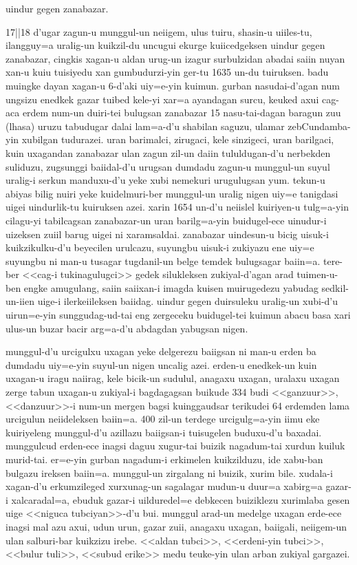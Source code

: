 \documentclass[11pt,a4paper]{article}
\begin{document}
\begin{bicigpage}
	uindur gegen zanabazar.

	17||18 d'ugar zagun-u munggul-un neiigem, ulus tuiru,
	shasin-u uiiles-tu, ilangguy=a uralig-un kuikzil-du
	uncugui ekurge kuiicedgeksen uindur gegen zanabazar,
	cingkis xagan-u aldan urug-un izagur surbulzidan abadai
	saiin nuyan xan-u kuiu tuisiyedu xan gumbudurzi-yin
	ger-tu 1635 un-du tuiruksen.  badu muingke dayan xagan-u
	6-d'aki uiy=e-yin kuimun. gurban nasudai-d'agan num
	ungsizu enedkek gazar tuibed kele-yi xar=a ayandagan
	surcu, keuked axui cag-aca erdem num-un duiri-tei
	bulugsan zanabazar 15 nasu-tai-dagan baragun zuu
	(lhasa) uruzu tabudugar dalai lam=a-d'u shabilan
	saguzu, ulamar zebCundamba-yin xubilgan tudurazei. uran
	barimalci, zirugaci, kele sinzigeci, uran barilgaci,
	kuin uxagandan zanabazar ulan zagun zil-un daiin
	tululdugan-d'u nerbekden suliduzu, zugsunggi
	baiidal-d'u urugsan dumdadu zagun-u munggul-un suyul
	uralig-i serkun manduxu-d'u yeke xubi nemekuri
	urugulugsan yum. tekun-u abiyas bilig nuiri yeke
	kuidelmuri-ber munggul-un uralig nigen uiy=e tanigdasi
	uigei uindurlik-tu kuiruksen azei. xarin 1654 un-d'u
	neiislel kuiriyen-u tulg=a-yin cilagu-yi tabilcagsan
	zanabazar-un uran barilg=a-yin buidugel-ece uinudur-i
	uizeksen zuiil barug uigei ni xaramsaldai. zanabazar
	uindesun-u bicig uisuk-i kuikzikulku-d'u beyecilen
	urulcazu, suyungbu uisuk-i zukiyazu ene uiy=e suyungbu
	ni man-u tusagar tugdanil-un belge temdek bulugsagar
	baiin=a.  tere-ber <<cag-i tukinagulugci>> gedek
	silukleksen zukiyal-d'agan arad tuimen-u-ben engke
	amugulang, saiin saiixan-i imagda kuisen muirugedezu
	yabudag sedkil-un-iien uige-i ilerkeiileksen
	baiidag. uindur gegen duirsuleku uralig-un xubi-d'u
	uirun=e-yin sunggudag-ud-tai eng zergeceku buidugel-tei
	kuimun abacu basa xari ulus-un buzar bacir arg=a-d'u
	abdagdan yabugsan nigen.

	munggul-d'u urcigulxu uxagan yeke delgerezu baiigsan ni
	man-u erden ba dumdadu uiy=e-yin suyul-un nigen uncalig
	azei. erden-u enedkek-un kuin uxagan-u iragu naiirag,
	kele bicik-un sudulul, anagaxu uxagan, uralaxu uxagan
	zerge tabun uxagan-u zukiyal-i bagdagagsan buikude 334
	budi <<ganzuur>>, <<danzuur>>-i num-un mergen bagsi
	kuinggaudsar terikudei 64 erdemden lama urcigulun
	neiideleksen baiin=a. 400 zil-un terdege urcigulg=a-yin
	iimu eke kuiriyeleng munggul-d'u azillazu baiigsan-i
	tuisugelen buduxu-d'u baxadai. munggulcud erden-ece
	inagsi daguu xugur-tai buizik nagadum-tai xurdun
	kuiluk murid-tai. er=e-yin gurban nagadum-i erkimelen
	kuikzilduzu, ide xabu-ban bulgazu ireksen baiin=a.
	munggul-un zirgalang ni buizik, xurim bile. xudala-i
	xagan-d'u erkumzileged xurxunag-un sagalagar mudun-u
	duur=a xabirg=a gazar-i xalcaradal=a, ebuduk gazar-i
	uilduredel=e debkecen buiziklezu xurimlaba gesen uige
	<<niguca tubciyan>>-d'u bui. munggul arad-un medelge
	uxagan erde-ece inagsi mal azu axui, udun urun,
	gazar zuii, anagaxu uxagan, baiigali, neiigem-un
	ulan salburi-bar kuikzizu irebe.  <<aldan tubci>>,
	<<erdeni-yin tubci>>, <<bulur tuli>>, <<subud erike>>
	medu teuke-yin ulan arban zukiyal gargazei.


\end{bicigpage}
\end{document}
